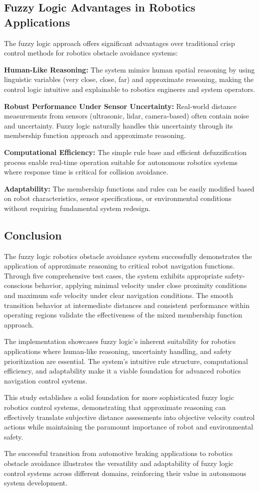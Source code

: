 \documentclass[11pt,a4paper]{article}
\begin{document}
\subsection{Fuzzy Logic Advantages in Robotics Applications}

The fuzzy logic approach offers significant advantages over traditional crisp control methods for robotics obstacle avoidance systems:

\textbf{Human-Like Reasoning:} The system mimics human spatial reasoning by using linguistic variables (very close, close, far) and approximate reasoning, making the control logic intuitive and explainable to robotics engineers and system operators.

\textbf{Robust Performance Under Sensor Uncertainty:} Real-world distance measurements from sensors (ultrasonic, lidar, camera-based) often contain noise and uncertainty. Fuzzy logic naturally handles this uncertainty through its membership function approach and approximate reasoning.

\textbf{Computational Efficiency:} The simple rule base and efficient defuzzification process enable real-time operation suitable for autonomous robotics systems where response time is critical for collision avoidance.

\textbf{Adaptability:} The membership functions and rules can be easily modified based on robot characteristics, sensor specifications, or environmental conditions without requiring fundamental system redesign.

\subsection{Conclusion}

The fuzzy logic robotics obstacle avoidance system successfully demonstrates the application of approximate reasoning to critical robot navigation functions. Through five comprehensive test cases, the system exhibits appropriate safety-conscious behavior, applying minimal velocity under close proximity conditions and maximum safe velocity under clear navigation conditions. The smooth transition behavior at intermediate distances and consistent performance within operating regions validate the effectiveness of the mixed membership function approach.

The implementation showcases fuzzy logic's inherent suitability for robotics applications where human-like reasoning, uncertainty handling, and safety prioritization are essential. The system's intuitive rule structure, computational efficiency, and adaptability make it a viable foundation for advanced robotics navigation control systems.

This study establishes a solid foundation for more sophisticated fuzzy logic robotics control systems, demonstrating that approximate reasoning can effectively translate subjective distance assessments into objective velocity control actions while maintaining the paramount importance of robot and environmental safety.

The successful transition from automotive braking applications to robotics obstacle avoidance illustrates the versatility and adaptability of fuzzy logic control systems across different domains, reinforcing their value in autonomous system development.
\end{document}
